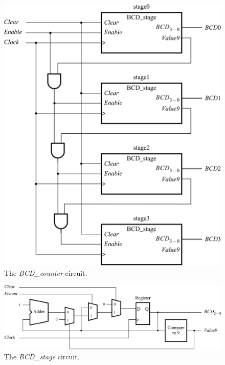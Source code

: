 \documentclass[11pt, twoside, pdftex]{article}
\begin{document}
\begin{figure}[H]
   \begin{center}
      \includegraphics[scale=0.80]{figures/figure10.png}
   \caption{The {\it BCD\_counter} circuit.} 
	 \label{fig:10}
	 \end{center}
\end{figure}

\begin{figure}[H]
   \begin{center}
      \includegraphics[scale=1]{figures/figure11.png}
   \caption{The {\it BCD\_stage} circuit.} 
	 \label{fig:11}
	 \end{center}
\end{figure}
\end{document}
